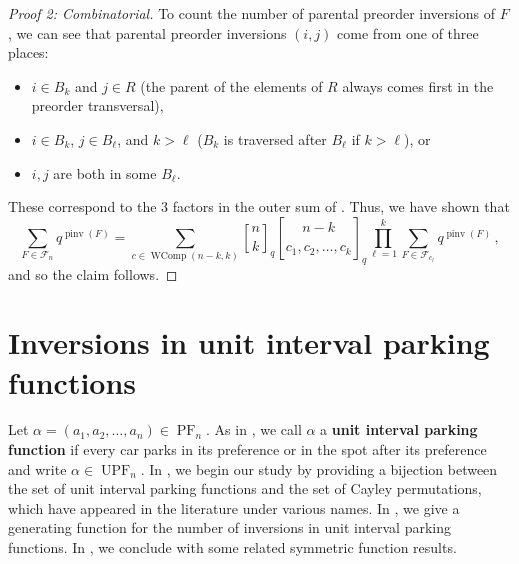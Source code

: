 \documentclass{amsart}
\newcommand{\eqcom}{\, ,}
\DeclareMathOperator{\PF}{PF}
\DeclareMathOperator{\UPF}{UPF} %
\DeclareMathOperator{\WComp}{WComp}
\DeclareMathOperator{\pinv}{pinv}
\newcommand{\qbinom}[2]{\genfrac{[}{]}{0pt}{}{#1}{#2}}%
\theoremstyle{definition}
\begin{document}
\begin{proof}[Proof 2: Combinatorial]
    To count the number of parental preorder inversions of $F$, we can see that parental preorder inversions $(i,j)$ come from one of three places:
    \begin{itemize}
        \item $i\in B_k$ and $j\in R$ (the parent of the elements of $R$ always comes first in the preorder transversal),
        \item $i\in B_k$, $j\in B_\ell$, and $k>\ell$ ($B_k$ is traversed after $B_\ell$ if $k>\ell$), or
        \item $i,j$ are both in some $B_\ell$.
    \end{itemize}
    These correspond to the 3 factors in the outer sum of .
    Thus, we have shown that
    \begin{equation}\label{eq:RLF-decomposition}
        \sum_{F\in \mathcal{F}_n}q^{\pinv(F)}=\sum_{c\in \WComp(n-k,k)}\qbinom{n}{k}_q\qbinom{n-k}{c_1,c_2,\dots, c_k}_q  \prod_{\ell=1}^k \sum_{F\in \mathcal{F}_{c_\ell}}q^{\pinv(F)} \eqcom
    \end{equation}
    and so the claim follows.
\end{proof}

\section{Inversions in unit interval parking functions}\label{sec:inversions-in-upfs}


Let $\alpha = (a_1, a_2, \ldots , a_n)\in \PF_n$.
As in \cite{bradt2024unit}, we call $\alpha$ a \textbf{unit interval parking function} if every car parks in its preference or in the spot after its preference and write $\alpha \in \UPF_n$.
In , we begin our study by providing a bijection between the set of unit interval parking functions and the set of Cayley permutations, which have appeared in the literature under various names.
In , we give a generating function for the number of inversions in unit interval parking functions.
In , we conclude with some related  symmetric function results.
\end{document}
